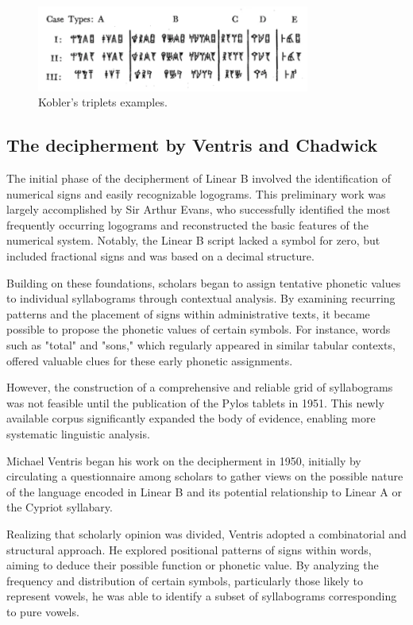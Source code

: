 \begin{figure}[H]
\centering
\includegraphics[width=0.8\textwidth]{Images/kobler_triplets.png}
\caption{Kobler's triplets examples.}
\label{fig:kobler_triplets}
\end{figure}

\subsection{The decipherment by Ventris and Chadwick} \label{subsec:ventris-chadwick}
The initial phase of the decipherment of Linear B involved the identification of numerical signs and easily recognizable logograms.
This preliminary work was largely accomplished by Sir Arthur Evans, who successfully identified the most frequently occurring logograms and reconstructed the basic features of the numerical system.
Notably, the Linear B script lacked a symbol for zero, but included fractional signs and was based on a decimal structure.

Building on these foundations, scholars began to assign tentative phonetic values to individual syllabograms through contextual analysis.
By examining recurring patterns and the placement of signs within administrative texts, it became possible to propose the phonetic values of certain symbols.
For instance, words such as "total" and "sons," which regularly appeared in similar tabular contexts, offered valuable clues for these early phonetic assignments.

However, the construction of a comprehensive and reliable grid of syllabograms was not feasible until the publication of the Pylos tablets in 1951.
This newly available corpus significantly expanded the body of evidence, enabling more systematic linguistic analysis.

Michael Ventris began his work on the decipherment in 1950, initially by circulating a questionnaire among scholars to gather views on the possible nature of the language encoded in Linear B and its potential relationship to Linear A or the Cypriot syllabary.

Realizing that scholarly opinion was divided, Ventris adopted a combinatorial and structural approach.
He explored positional patterns of signs within words, aiming to deduce their possible function or phonetic value.
By analyzing the frequency and distribution of certain symbols, particularly those likely to represent vowels, he was able to identify a subset of syllabograms corresponding to pure vowels.

